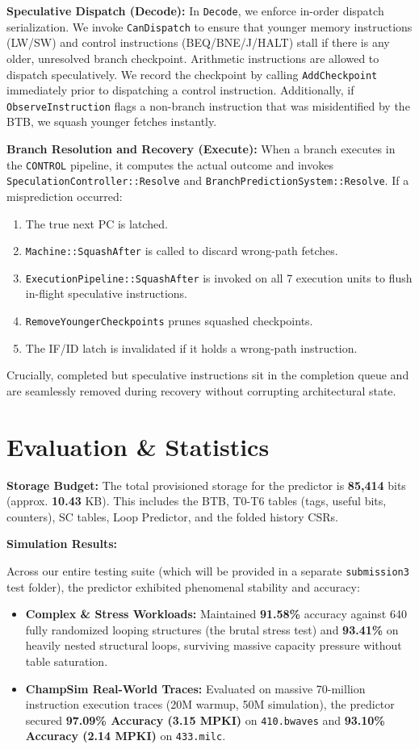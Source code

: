 \documentclass[11pt, a4paper]{article}
\begin{document}
\textbf{Speculative Dispatch (Decode):}
In \texttt{Decode}, we enforce in-order dispatch serialization. We invoke \texttt{CanDispatch} to ensure that younger memory instructions (LW/SW) and control instructions (BEQ/BNE/J/HALT) stall if there is any older, unresolved branch checkpoint. Arithmetic instructions are allowed to dispatch speculatively. We record the checkpoint by calling \texttt{AddCheckpoint} immediately prior to dispatching a control instruction. Additionally, if \texttt{ObserveInstruction} flags a non-branch instruction that was misidentified by the BTB, we squash younger fetches instantly.

\textbf{Branch Resolution and Recovery (Execute):}
When a branch executes in the \texttt{CONTROL} pipeline, it computes the actual outcome and invokes \texttt{SpeculationController::Resolve} and \texttt{BranchPredictionSystem::Resolve}. If a misprediction occurred:
\begin{enumerate}
    \item The true next PC is latched.
    \item \texttt{Machine::SquashAfter} is called to discard wrong-path fetches.
    \item \texttt{ExecutionPipeline::SquashAfter} is invoked on all 7 execution units to flush in-flight speculative instructions.
    \item \texttt{RemoveYoungerCheckpoints} prunes squashed checkpoints.
    \item The IF/ID latch is invalidated if it holds a wrong-path instruction.
\end{enumerate}
Crucially, completed but speculative instructions sit in the completion queue and are seamlessly removed during recovery without corrupting architectural state.

\section{Evaluation \& Statistics}

\textbf{Storage Budget:}
The total provisioned storage for the predictor is \textbf{85,414} bits (approx. \textbf{10.43} KB). This includes the BTB, T0-T6 tables (tags, useful bits, counters), SC tables, Loop Predictor, and the folded history CSRs.

\textbf{Simulation Results:}

Across our entire testing suite (which will be provided in a separate \texttt{submission3} test folder), the predictor exhibited phenomenal stability and accuracy:
\begin{itemize}
    \item \textbf{Complex \& Stress Workloads:} Maintained \textbf{91.58\%} accuracy against 640 fully randomized looping structures (the brutal stress test) and \textbf{93.41\%} on heavily nested structural loops, surviving massive capacity pressure without table saturation.
    \item \textbf{ChampSim Real-World Traces:} Evaluated on massive 70-million instruction execution traces (20M warmup, 50M simulation), the predictor secured \textbf{97.09\% Accuracy (3.15 MPKI)} on \texttt{410.bwaves} and \textbf{93.10\% Accuracy (2.14 MPKI)} on \texttt{433.milc}.
\end{itemize}
\end{document}
